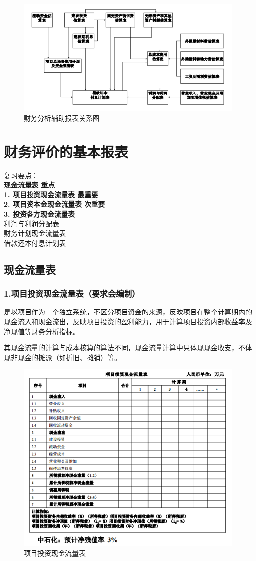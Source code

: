 \begin{figure}[H]
    \centering
    \includegraphics[width=\linewidth]{image/财务分析辅助报表关系图.png}
    \caption{财务分析辅助报表关系图}
\end{figure}

\section{财务评价的基本报表}

\noindent 复习要点：\\
\textbf{现金流量表 重点}\\
\textbf{1. 项目投资现金流量表 最重要}\\
\textbf{2. 项目资本金现金流量表 次重要}\\
\textbf{3. 投资各方现金流量表}\\
利润与利润分配表\\
财务计划现金流量表\\
借款还本付息计划表

\subsection{现金流量表}
\subsubsection{1.项目投资现金流量表（要求会编制）}
是以项目作为一个独立系统，不区分项目资金的来源，反映项目在整个计算期内的现金流入和现金流出，反映项目投资的盈利能力，用于计算项目投资内部收益率及净现值等财务分析指标。

其现金流量的计算与成本核算的算法不同，现金流量计算中只体现现金收支，不体现非现金的摊派（如折旧、摊销）等。

\begin{figure}[H]
    \centering
    \includegraphics[width=0.6\linewidth]{image/项目投资现金流量表1.png}
    \caption{项目投资现金流量表}
\end{figure}

